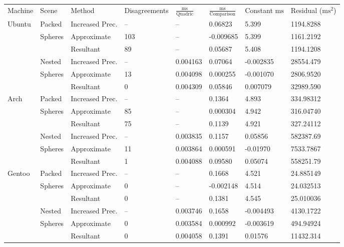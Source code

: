 \begin{tabular}{|l|l|ll|lll|l|}
\hline
Machine & Scene & Method & Disagreements & $\frac{\text{ms}}{\text{Quadric}}$ & $\frac{\text{ms}}{\text{Comparison}}$ & Constant $\text{ms}$ & Residual ($\text{ms}^2$)\\
\hhline{|=|=|==|===|=|}
Ubuntu & Packed & Increased Prec. & -- & -- & \hphantom{-}0.06823 & \hphantom{-}5.399 & 1194.8288\\
& Spheres & Approximate & 103 & -- & -0.009685 & \hphantom{-}5.399 & 1161.2192\\
&& Resultant & 89 & -- & \hphantom{-}0.05687 & \hphantom{-}5.408 & 1194.1208\\
\hline
& Nested & Increased Prec. & -- & 0.004163 & \hphantom{-}0.07064 & -0.002835 & 28554.479\\
& Spheres & Approximate & 13 & 0.004098 & \hphantom{-}0.000255 & -0.001070 & \hphantom{2}2806.9520\\
&& Resultant & 0 & 0.004309 & \hphantom{-}0.05846 & \hphantom{-}0.007079 & 32989.590\\
\hline
Arch & Packed & Increased Prec. & -- & -- & \hphantom{-}0.1364 & \hphantom{-}4.893 & 334.98312\\
& Spheres & Approximate & 85 & -- & \hphantom{-}0.000304 & \hphantom{-}4.942 & 316.04740\\
&& Resultant & 75 & -- & \hphantom{-}0.1139 & \hphantom{-}4.921 & 327.24112\\
\hline
& Nested & Increased Prec. & -- & 0.003835 & \hphantom{-}0.1157 & \hphantom{-}0.05856 & 582387.69\\
& Spheres & Approximate & 11 & 0.003864 & \hphantom{-}0.000591 & -0.01970 & 7533.7867\\
&& Resultant & 1 & 0.004088 & \hphantom{-}0.09580 & \hphantom{-}0.05074 & 558251.79\\
\hline
Gentoo & Packed & Increased Prec. & -- & -- & \hphantom{-}0.1668 & \hphantom{-}4.521 & 24.885149\\
& Spheres & Approximate & 0 & -- & -0.002148 & \hphantom{-}4.514 & 24.032513\\
&& Resultant & 0 & -- & \hphantom{-}0.1381 & \hphantom{-}4.545 & 25.010036\\
\hline
& Nested & Increased Prec. & -- & 0.003746 & \hphantom{-}0.1658 & -0.004493 & 4130.1722\\
& Spheres & Approximate & 0 & 0.003584 & \hphantom{-}0.000992 & -0.003619 & \hphantom{4}494.94924\\
&& Resultant & 0 & 0.004058 & \hphantom{-}0.1391 & \hphantom{-}0.01576 & 11432.314\\
\hline
\end{tabular}
